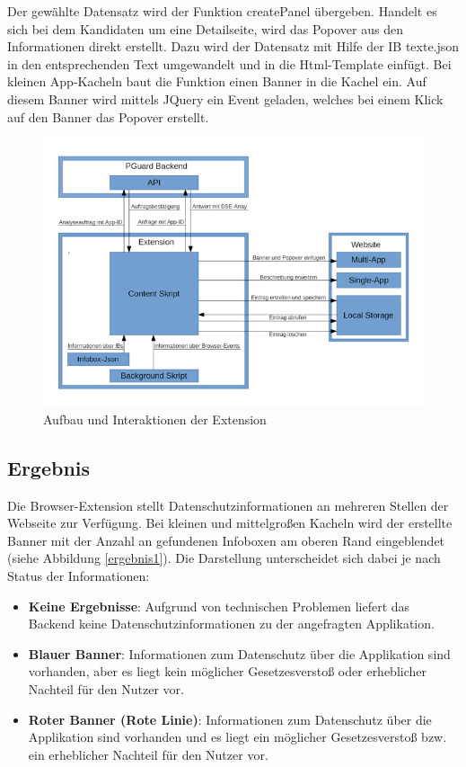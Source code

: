 Der gewählte Datensatz wird der Funktion \glqq createPanel\grqq{} übergeben. Handelt es sich bei dem Kandidaten um eine Detailseite, wird das Popover aus den Informationen direkt erstellt. Dazu wird der Datensatz mit Hilfe der IB texte.json in den entsprechenden Text umgewandelt und in die Html-Template einfügt.
Bei kleinen App-Kacheln baut die Funktion einen Banner in die Kachel ein. Auf diesem Banner wird mittels JQuery ein Event geladen, welches bei einem Klick auf den Banner das Popover erstellt.

\begin{figure}[ht]
	\centering
	\includegraphics[width=1\textwidth]{pics/Aufbau.png}
	\caption{Aufbau und Interaktionen der Extension}
	\label{aufbau}
\end{figure}


\subsection{Ergebnis}
\label{ss:ergebnisseht1}

Die Browser-Extension stellt Datenschutzinformationen an mehreren Stellen der Webseite zur Verfügung. Bei kleinen und mittelgroßen Kacheln wird der erstellte Banner mit der Anzahl an gefundenen Infoboxen am oberen Rand eingeblendet (siehe Abbildung \ref{ergebnis1}). Die Darstellung unterscheidet sich dabei je nach Status der Informationen:

\begin{itemize}
	\item \textbf{\glqq Keine Ergebnisse\grqq{}}:
	Aufgrund von technischen Problemen liefert das Backend keine Datenschutzinformationen zu der angefragten Applikation.
	\item \textbf{Blauer Banner}:
	Informationen zum Datenschutz über die Applikation sind vorhanden, aber es liegt kein möglicher Gesetzesverstoß oder erheblicher Nachteil für den Nutzer vor.
	\item \textbf{Roter Banner (\glqq Rote Linie\grqq{})}:
	Informationen zum Datenschutz über die Applikation sind vorhanden und es liegt ein möglicher Gesetzesverstoß bzw. ein erheblicher Nachteil für den Nutzer vor.
\end{itemize}

